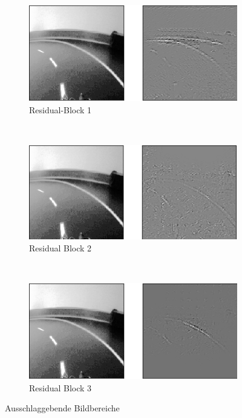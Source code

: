 \begin{figure}
	\centering
	\begin{subfigure}{\textwidth}
	\centering
		  \includegraphics[width=0.8\linewidth]{figures/firstBlock.png}
	 	  \caption{Residual-Block 1}
		  \label{fig:saliena}
	\end{subfigure}\\
	\begin{subfigure}{\textwidth}
	\centering
		  \includegraphics[width=0.8\linewidth]{figures/secondBlock.png}
	 	  \caption{Residual Block 2}
		  \label{fig:salienb}
	\end{subfigure}\\
	\begin{subfigure}{\textwidth}
	\centering
		  \includegraphics[width=0.8\linewidth]{figures/thirdBlock.png}
	 	  \caption{Residual Block 3}
		  \label{fig:salienc}
	\end{subfigure}%
	\caption{Ausschlaggebende Bildbereiche}
	\label{img:saliency}
\end{figure}%

